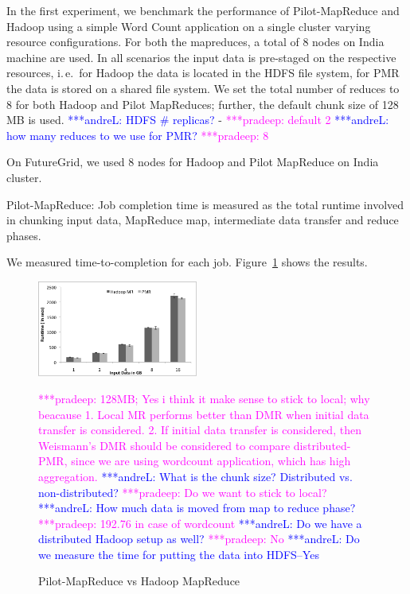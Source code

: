 \documentclass{acm_proc_article-sp}
\newcommand{\alnote}[1]{ {\textcolor{blue} { ***andreL: #1 }}}
\newcommand{\pnote}[1]{ {\textcolor{magenta} { ***pradeep: #1 }}}
\newcommand{\alnote}[1]{}
\newcommand{\pnote}[1]{}
\newcommand{\pilotmapreduce}{Pilot-MapReduce\xspace}
\begin{document}
In the first experiment, we benchmark the performance of \pilotmapreduce and
Hadoop using a simple Word Count application on a single cluster varying resource
configurations. For both the mapreduces, 
a total of 8 nodes on India machine are used.  In all scenarios the input data is 
pre-staged on the respective resources, i.\,e.\ for Hadoop the data is located 
in the HDFS file system, for PMR the data is stored on a shared file system. 
We set the total number of reduces to 8 for both Hadoop and Pilot MapReduces; further, the default chunk size 
of 128\,MB is used.\alnote{HDFS \# replicas?} - \pnote{default 2}\alnote{how many reduces to we use for PMR?} \pnote{8}

On FutureGrid, we used 8 nodes for Hadoop and Pilot MapReduce on India cluster. 



\pilotmapreduce: Job completion time is measured as the total runtime involved 
in chunking input data, MapReduce map, intermediate data transfer and reduce 
phases.

We measured time-to-completion for each job. Figure~\ref{fig:figures_compMR} 
shows the results.

\begin{figure}[compMR]
	\centering
		\includegraphics[width=0.47\textwidth]{figures/HMRvsL-PMRvsD-PMR.png}
	\caption{Pilot-MapReduce vs Hadoop MapReduce} \pnote{128MB; Yes i think it make sense to stick to local; why beacause
1. Local MR performs better than DMR when initial data transfer is considered.
2. If initial data transfer is considered, then Weismann's DMR should be considered to compare distributed-PMR, since we are using wordcount application, which has high aggregation.}
	\alnote{What is the chunk size? Distributed vs. non-distributed? }\pnote{Do we want to stick to local?}
	\alnote{How much data is moved from map to reduce phase?} \pnote{192.76 in case of wordcount} 
	\alnote{Do we have a distributed Hadoop setup as well?}\pnote{No}
	\alnote{Do we measure the time for putting the data into HDFS--Yes}
	\label{fig:figures_compMR}
\end{figure}
\end{document}
